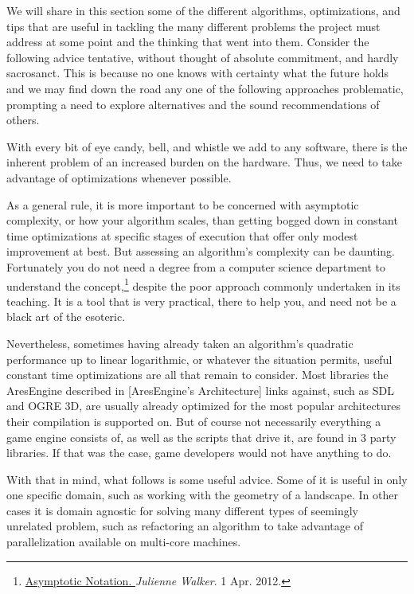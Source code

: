 
We will share in this section some of the different algorithms, optimizations, and tips that are useful in tackling the many different problems the project must address at some point and the thinking that went into them. Consider the following advice tentative, without thought of absolute commitment, and hardly sacrosanct. This is because no one knows with certainty what the future holds and we may find down the road any one of the following approaches problematic, prompting a need to explore alternatives and the sound recommendations of others. 

With every bit of eye candy, bell, and whistle we add to any software, there is the inherent problem of an increased burden on the hardware. Thus, we need to take advantage of optimizations whenever possible. 

As a general rule, it is more important to be concerned with asymptotic complexity, or how your algorithm scales, than getting bogged down in constant time optimizations at specific stages of execution that offer only modest improvement at best. But assessing an algorithm's complexity can be daunting. Fortunately you do not need a degree from a computer science department to understand the concept,\footnote{\href{http://www.eternallyconfuzzled.com/arts/jsw_art_bigo.aspx}{Asymptotic Notation. }{\it Julienne Walker}. 1 Apr. 2012.} despite the poor approach commonly undertaken in its teaching. It is a tool that is very practical, there to help you, and need not be a black art of the esoteric.

Nevertheless, sometimes having already taken an algorithm's quadratic performance up to linear logarithmic, or whatever the situation permits, useful constant time optimizations are all that remain to consider. Most libraries the AresEngine described in [AresEngine's Architecture] links against, such as SDL and OGRE 3D, are usually already optimized for the most popular architectures their compilation is supported on. But of course not necessarily everything a game engine consists of, as well as the scripts that drive it, are found in 3 party libraries. If that was the case, game developers would not have anything to do.

With that in mind, what follows is some useful advice. Some of it is useful in only one specific domain, such as working with the geometry of a landscape. In other cases it is domain agnostic for solving many different types of seemingly unrelated problem, such as refactoring an algorithm to take advantage of parallelization available on multi-core machines.

